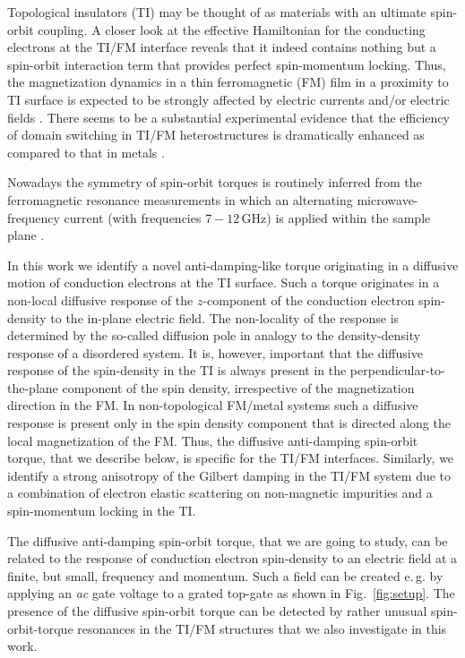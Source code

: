 Topological insulators (TI) \cite{fu_topological_2007,moore_topological_2007,roy_topological_2009,hsieh_topological_2008} may be thought of as materials with an ultimate spin-orbit coupling. A closer look at the effective Hamiltonian for the conducting electrons at the TI/FM interface reveals that it indeed contains nothing but a spin-orbit interaction term that provides perfect spin-momentum locking. Thus, the magnetization dynamics in a thin ferromagnetic (FM) film in a proximity to TI surface is expected to be strongly affected by electric currents and/or electric fields \cite{qi_fractional_2008}. There seems to be a substantial experimental evidence that the efficiency of domain switching in TI/FM heterostructures is dramatically enhanced as compared to that in metals \cite{mellnik_spin-transfer_2014,wang_SOT_BiSe_2014,fan_magnetization_2014,Fan_SOT_TI_2016,Yasuda_SOT_BiSbTe_2017,Cha2018}. 

Nowadays the symmetry of spin-orbit torques is routinely inferred from the ferromagnetic resonance measurements in which an alternating microwave-frequency current (with frequencies $7-12$\,GHz) is applied within the sample plane \cite{mellnik_spin-transfer_2014,Ralph2011SOTFMresonance,Wang2015_SOTHflCoFEBIMgO,Ralph2016SOTWTE2,Ralph2018SOT}. 

In this work we identify a novel anti-damping-like torque originating in a diffusive motion of conduction electrons at the TI surface. Such a torque originates in a non-local diffusive response of the $z$-component of the conduction electron spin-density to the in-plane electric field. The non-locality of the response is determined by the so-called diffusion pole in analogy to the density-density response of a disordered system. It is, however, important that the diffusive response of the spin-density in the TI is always present in the perpendicular-to-the-plane component of the spin density, irrespective of the magnetization direction in the FM. In non-topological FM/metal systems such a diffusive response is present only in the spin density component that is directed along the local magnetization of the FM. Thus, the diffusive anti-damping spin-orbit torque, that we describe below, is specific for the TI/FM interfaces. Similarly, we identify a strong anisotropy of the Gilbert damping in the TI/FM system due to a combination of electron elastic scattering on non-magnetic impurities and a spin-momentum locking in the TI.  



The diffusive anti-damping spin-orbit torque, that we are going to study, can be related to the response of conduction electron spin-density to an electric field at a finite, but small, frequency and momentum. Such a field can be created e.\,g. by applying an \textit{ac} gate voltage to a grated top-gate as shown in Fig.~\ref{fig:setup}. The presence of the diffusive spin-orbit torque can be detected by rather unusual spin-orbit-torque resonances in the TI/FM structures that we also investigate in this work. 

